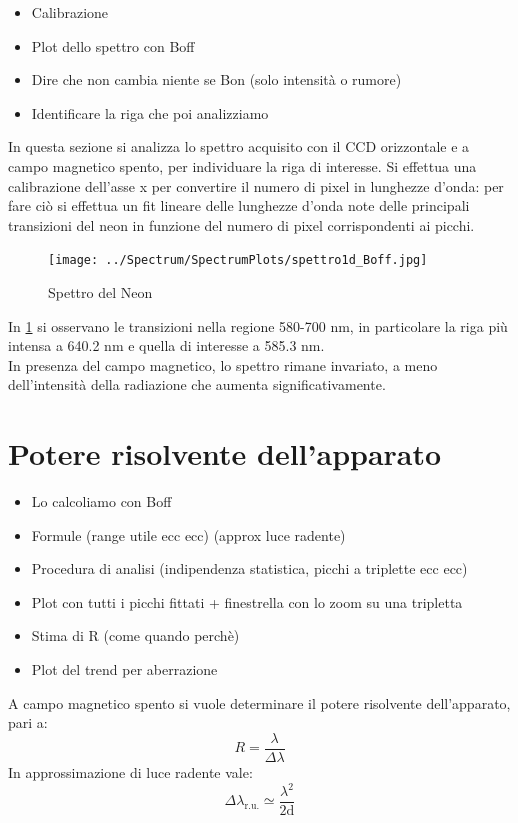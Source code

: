 \documentclass[twocolumn,10pt]{asme2ej}
\begin{document}
\begin{itemize}
    \item Calibrazione
    \item Plot dello spettro con Boff
    \item Dire che non cambia niente se Bon (solo intensità o rumore)
    \item Identificare la riga che poi analizziamo
\end{itemize}
In questa sezione si analizza lo spettro acquisito con il CCD orizzontale e a campo magnetico spento, per individuare la riga di interesse. 
Si effettua una calibrazione dell'asse x per convertire il numero di pixel in lunghezze d'onda: per fare ciò si effettua un fit lineare 
delle lunghezze d'onda note delle principali transizioni del neon in funzione del numero di pixel corrispondenti ai picchi. 
 
\begin{figure}
    \centering
    \texttt{[image: ../Spectrum/SpectrumPlots/spettro1d\_Boff.jpg]}
    \caption{Spettro del Neon}
    \label{i:spettro1d}
\end{figure}


In \figurename\ref{i:spettro1d} si osservano le transizioni nella regione 580-700 \si{\nano \metre}, in particolare la riga più intensa 
a 640.2 \si{\nano \metre} e quella di interesse a 585.3 \si{\nano \metre}.\\
In presenza del campo magnetico, lo spettro rimane invariato, a meno dell'intensità della radiazione che aumenta significativamente. 

\section{Potere risolvente dell'apparato}

\begin{itemize}
    \item Lo calcoliamo con Boff
    \item Formule (range utile ecc ecc) (approx luce radente) 
    \item Procedura di analisi (indipendenza statistica, picchi a triplette ecc ecc)
    \item Plot con tutti i picchi fittati + finestrella con lo zoom su una tripletta
    \item Stima di R (come quando perchè)
    \item Plot del trend per aberrazione 
\end{itemize}
A campo magnetico spento si vuole determinare il potere risolvente dell'apparato, pari a:
\begin{equation}
    R = \frac{\lambda}{\Delta \lambda}
\end{equation}
In approssimazione di luce radente vale:
\begin{equation}
    \Delta \lambda_{\text{r.u.}} \simeq \frac{\lambda^2}{2\text{d}}
    \label{e:lambdaru}
\end{equation}
\end{document}
